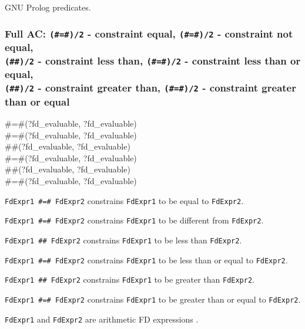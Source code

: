 \Portability

GNU Prolog predicates.

\subsubsection{Full AC: \texttt{(\#=\#)/2} - constraint equal,
               \texttt{(\#{\bs}=\#)/2} - constraint not equal, \\
               \texttt{(\#{\lt}\#)/2} - constraint less than,
               \texttt{(\#={\lt}\#)/2} - constraint less than or equal, \\
               \texttt{(\#{\gt}\#)/2} - constraint greater than,
               \texttt{(\#{\gt}=\#)/2} - constraint greater than or equal}
\label{Full-AC:-(:=:)/2}

\begin{TemplatesOneCol}
\#=\#(?fd\_evaluable, ?fd\_evaluable)\\
\#{\bs}=\#(?fd\_evaluable, ?fd\_evaluable)\\
\#{\lt}\#(?fd\_evaluable, ?fd\_evaluable)\\
\#={\lt}\#(?fd\_evaluable, ?fd\_evaluable)\\
\#{\gt}\#(?fd\_evaluable, ?fd\_evaluable)\\
\#{\gt}=\#(?fd\_evaluable, ?fd\_evaluable)

\end{TemplatesOneCol}

\Description

\texttt{FdExpr1 \#=\# FdExpr2} constrains \texttt{FdExpr1} to
be equal to \texttt{FdExpr2}.

\texttt{FdExpr1 \#{\bs}=\# FdExpr2} constrains \texttt{FdExpr1} to be
different from \texttt{FdExpr2}.

\texttt{FdExpr1 \#{\lt}\# FdExpr2} constrains \texttt{FdExpr1}
to be less than \texttt{FdExpr2}.

\texttt{FdExpr1 \#={\lt}\# FdExpr2} constrains \texttt{FdExpr1} to be
less than or equal to \texttt{FdExpr2}.

\texttt{FdExpr1 \#{\gt}\# FdExpr2} constrains \texttt{FdExpr1}
to be greater than \texttt{FdExpr2}.

\texttt{FdExpr1 \#{\gt}=\# FdExpr2} constrains \texttt{FdExpr1} to be
greater than or equal to \texttt{FdExpr2}.

\texttt{FdExpr1} and \texttt{FdExpr2} are arithmetic FD expressions
.

